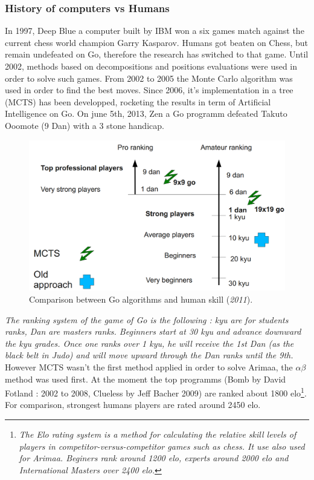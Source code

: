 

\subsubsection{History of computers vs Humans}
In 1997, Deep Blue a computer built by IBM won a six games match against the current chess world champion Garry Kasparov. Humans got beaten on Chess, but remain undefeated on Go, therefore the research has switched to that game. Until 2002, methods based on decompositions and positions evaluations were used in order to solve such games. From 2002 to 2005 the Monte Carlo algorithm was used in order to find the best moves. Since 2006, it's implementation in a tree (MCTS) has been developped, rocketing the results in term of Artificial Intelligence on Go. On june 5th, 2013, Zen a Go programm defeated Takuto Ooomote (9 Dan) with a 3 stone handicap.\cite{computer_Go_vs_human}
\begin{figure}[H]
\centering
\includegraphics[width=12cm]{2_State_of_the_art/Arimaa_on_MCTS_Benoit/img/ranking.png}
\caption{\label{fig:ranking}Comparison between Go algorithms and human skill (\textit{2011}).}
\end{figure}
\textit{The ranking system of the game of Go is the following : kyu are for students ranks, Dan are masters ranks. Beginners start at 30 kyu and advance downward the kyu grades. Once one ranks over 1 kyu, he will receive the 1st Dan (as the black belt in Judo) and will move upward through the Dan ranks until the 9th.}\\
However MCTS wasn't the first method applied in order to solve Arimaa, the \ensuremath{\alpha\beta} method was used first. At the moment the top programms (Bomb by David Fotland : 2002 to 2008, Clueless by Jeff Bacher 2009) are ranked about 1800 elo\footnote{\textit{The Elo rating system is a method for calculating the relative skill levels of players in competitor-versus-competitor games such as chess. It use also used for Arimaa. Beginers rank around 1200 elo, experts around 2000 elo and International Masters over 2400 elo.}}. For comparison, strongest humans players are rated around 2450 elo.\cite{master_mcts_kozeleck}
\medskip
